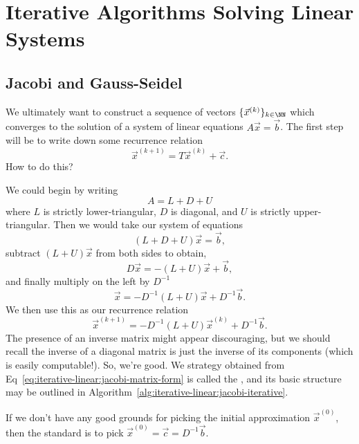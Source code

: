 \chapter{Iterative Algorithms Solving Linear Systems}

\section{Jacobi and Gauss-Seidel}

We ultimately want to construct a sequence of vectors
$\{\vec{x}^{(k)}\}_{k\in\NN}$ which converges to the solution of a
system of linear equations $A\vec{x}=\vec{b}$. The first step will be to
write down some recurrence relation
\begin{equation}
\vec{x}^{(k+1)}=T\vec{x}^{(k)}+\vec{c}.
\end{equation}
How to do this?

We could begin by writing
\begin{equation}
A = L + D + U
\end{equation}
where $L$ is strictly lower-triangular, $D$ is diagonal, and $U$ is
strictly upper-triangular. Then we would take our system of equations
\begin{equation}
(L+D+U)\vec{x}=\vec{b},
\end{equation}
subtract $(L+U)\vec{x}$ from both sides to obtain,
\begin{equation}
D\vec{x}=-(L+U)\vec{x}+\vec{b},
\end{equation}
and finally multiply on the left by $D^{-1}$
\begin{equation}
\vec{x}=-D^{-1}(L+U)\vec{x}+D^{-1}\vec{b}.
\end{equation}
We then use this as our recurrence relation
\begin{equation}\label{eq:iterative-linear:jacobi-matrix-form}
\vec{x}^{(k+1)}=-D^{-1}(L+U)\vec{x}^{(k)}+D^{-1}\vec{b}.
\end{equation}
The presence of an inverse matrix might appear discouraging, but we
should recall the inverse of a diagonal matrix is just the inverse of
its components (which is easily computable!). So, we're good. We
strategy obtained from Eq~\eqref{eq:iterative-linear:jacobi-matrix-form}
is called the , and its basic structure may be
outlined in Algorithm~\ref{alg:iterative-linear:jacobi-iterative}.

If we don't have any good grounds for picking the initial approximation
$\vec{x}^{(0)}$, then the standard is to pick $\vec{x}^{(0)}=\vec{c}=D^{-1}\vec{b}$.

